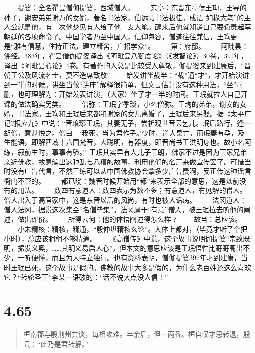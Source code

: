 \documentclass[]{book}
\begin{document}
　　提婆：全名瞿昙僧伽提婆，西域僧人。
　　东亭：东晋东亭侯王珣，王导的孙子，谢安弟弟谢万的女婿，著名书法家，伯远帖书法极佳。成语``如椽大笔''的主人公就是他，有一次他梦见有人给了他一支大笔。醒来后他就知道自己要负责起草朝廷的各项命令了。中国学者乃至中国人，信仰包容，僧道往往兼信，王珣更是``雅有信慧，住持正法，建立精舍，广招学众''。
　　第：府邸。
　　阿毗昙：佛经。383年，瞿昙僧伽提婆译出《阿毗昙八犍度论》（《发智论》）30卷，391年，译出《阿毗昙心论》4卷。有著作的人总是比较受人尊敬，伽提婆来到建康后，``晋朝王公及风流名士，莫不造席致敬''
　　始发讲坐裁半：``裁''通``才''，才开始演讲到一半的时候。讲坐当做``讲座''解释很简单，但文言估计没有这种用法，``坐''可删，也可理解为：开始发表讲演，（大家）坐了才一半的时间。王珉就拉人自己开课的做法确实另类。
　　僧弥：王珉字季琰，小名僧弥。王珣的弟弟，谢安的女婿，书法家。王珣和王珉后来都和谢家的女儿离婚了，王珉后来另娶。据《太平广记?报应九》中说：``晋琅琊王珉，其妻无子，尝祈观世音云乞儿。珉后路行，逢一胡僧，意甚悦之。僧曰：`我死，当为君作子。'少时，道人果亡，而珉妻有孕，及生能语，即解西域十六国梵音，大聪明，有器度，即晋尚书王洪明身也。故小名阿练，叙前生时，事事有验。''
王珉其实早有大儿子王朗，佛家不过是因为王家兄弟亲近佛教，故意编出这种乱七八糟的故事，利用他们的名声来做宣传罢了。可惜当时没有广告代言，不然王练可以从中国佛教协会拿多少广告费啊，反正传这种谣言衙门不管的。
　　都已晓：魏晋时候开始用``都''来表示全部的意思，这是以前没有的用法。
　　数四有意道人：数四表示为数不多；有意道人，有见解的僧人。僧人出入于高官家中，这是东晋以后的风尚，有时也被人诟病。
　　法冈道人：僧人法冈，据说这次集会``名僧毕集''。法冈属于``有意''僧人，被王珉拉去听他的阐述，做出评价。
　　所得云何：他的体悟阐述得怎么样？ 　　故当：总应该。
　　小未精核：精核，精通，``殷仲堪精核玄论''。大体上都对，（毕竟才听了个把小时），总应该稍稍不够精通。
　　《高僧传》中说，这个故事说明伽提婆``宗致既明，振发义奥，\ldots{}\ldots{}其明义易启人心''，但本文的意思应该是王珉悟性比哥哥高出不少，一听便懂，而且为人特立独行。也有资料表明，僧伽提婆397年才到建康，当时王珉已死，这个故事是假的。佛教的故事大多是假的，为什么老百姓还这么喜欢它？``转轮圣王''李某一语破的：``话不说大点没人信！''

\section{4.65}\label{section-242}

\begin{quote}
桓南郡与殷荆州共谈，每相攻难。年余后，但一两番。桓自叹才思转退，殷云：``此乃是君转解。''
\end{quote}
\end{document}
